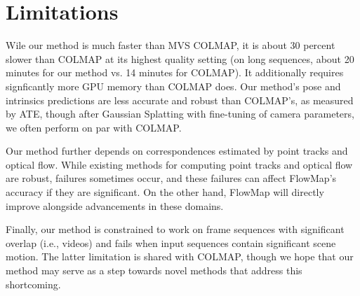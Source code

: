 \section{Limitations}
Wile our method is much faster than MVS COLMAP, it is about 30 percent slower than COLMAP at its highest quality setting (on long sequences, about 20 minutes for our method vs. 14 minutes for COLMAP).
It additionally requires signficantly more GPU memory than COLMAP does.
Our method's pose and intrinsics predictions are less accurate and robust than COLMAP's, as measured by ATE, though after Gaussian Splatting with fine-tuning of camera parameters, we often perform on par with COLMAP.

Our method further depends on correspondences estimated by point tracks and optical flow.
While existing methods for computing point tracks and optical flow are robust, failures sometimes occur, and these failures can affect FlowMap's accuracy if they are significant.
On the other hand, FlowMap will directly improve alongside advancements in these domains.

Finally, our method is constrained to work on frame sequences with significant overlap (i.e., videos) and fails when input sequences contain significant scene motion.
The latter limitation is shared with COLMAP, though we hope that our method may serve as a step towards novel methods that address this shortcoming.
